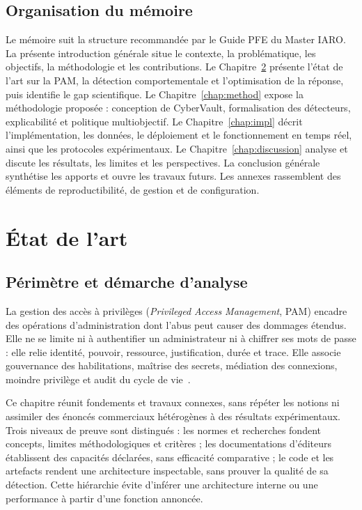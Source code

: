 \documentclass[11pt,a4paper,oneside]{report}
\theoremstyle{definition}
\theoremstyle{plain}
\begin{document}
\section{Organisation du mémoire}
\label{sec:intro-outline}

Le mémoire suit la structure recommandée par le Guide PFE du Master IARO.
La présente introduction générale situe le contexte, la problématique, les
objectifs, la méthodologie et les contributions. Le
Chapitre~\ref{chap:sota} présente l'état de l'art sur la PAM, la détection
comportementale et l'optimisation de la réponse, puis identifie le gap
scientifique. Le Chapitre~\ref{chap:method} expose la méthodologie proposée :
conception de CyberVault, formalisation des détecteurs, explicabilité et
politique multiobjectif. Le Chapitre~\ref{chap:impl} décrit
l'implémentation, les données, le déploiement et le fonctionnement en temps
réel, ainsi que les protocoles expérimentaux. Le
Chapitre~\ref{chap:discussion} analyse et discute les résultats, les limites
et les perspectives. La conclusion générale synthétise les apports et ouvre
les travaux futurs. Les annexes rassemblent des éléments de reproductibilité,
de gestion et de configuration.

\chapter{État de l'art}
\label{chap:sota}

\section{Périmètre et démarche d'analyse}

La gestion des accès à privilèges (\emph{Privileged Access Management}, PAM) encadre des opérations d'administration dont l'abus peut causer des dommages étendus. Elle ne se limite ni à authentifier un administrateur ni à chiffrer ses mots de passe : elle relie identité, pouvoir, ressource, justification, durée et trace. Elle associe gouvernance des habilitations, maîtrise des secrets, médiation des connexions, moindre privilège et audit du cycle de vie~\cite{ref1,ref2}.

Ce chapitre réunit fondements et travaux connexes, sans répéter les notions ni assimiler des énoncés commerciaux hétérogènes à des résultats expérimentaux. Trois niveaux de preuve sont distingués : les normes et recherches fondent concepts, limites méthodologiques et critères ; les documentations d'éditeurs établissent des capacités déclarées, sans efficacité comparative ; le code et les artefacts rendent une architecture inspectable, sans prouver la qualité de sa détection. Cette hiérarchie évite d'inférer une architecture interne ou une performance à partir d'une fonction annoncée.
\end{document}
